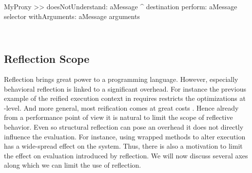 \begin{stcode}{}
MyProxy >> doesNotUnderstand: aMessage
	^ destination 
		perform: aMessage selector
		withArguments: aMessage arguments
\end{stcode}

\\

\subsection{Reflection Scope}
Reflection brings great power to a programming language.
However, especially behavioral reflection is linked to a significant overhead.
For instance the previous example of the reified execution context in \ST requires restricts the optimizations at \VM-level.
And more general, most reification comes at great costs \cite{Male96a}.
Hence already from a performance point of view it is natural to limit the scope of reflective behavior.
Even so structural reflection can pose an overhead it does not directly influence the evaluation.
For instance, using wrapped methods to alter execution has a wide-spread effect on the system.
Thus, there is also a motivation to limit the effect on evaluation introduced by reflection. 
We will now discuss several axes along which we can limit the use of reflection.
%
